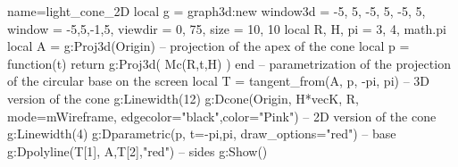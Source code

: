 \documentclass{standalone}
\begin{document}
\begin{luadraw}{name=light_cone_2D}
    local g = graph3d:new{
        window3d = {-5, 5, -5, 5, -5, 5},
        window = {-5,5,-1,5},
        viewdir = {0, 75},
        size = {10, 10}
    }
    local R, H, pi = 3, 4, math.pi
    local A = g:Proj3d(Origin) -- projection of the apex of the cone
    local p = function(t) return g:Proj3d( Mc(R,t,H) ) end -- parametrization of the projection of the circular base on the screen
    local T = tangent_from(A, p, -pi, pi)
    -- 3D version of the cone
    g:Linewidth(12)
    g:Dcone(Origin, H*vecK, R, {mode=mWireframe, edgecolor="black",color="Pink"})
    -- 2D version of the cone
    g:Linewidth(4)
    g:Dparametric(p, {t={-pi,pi}, draw_options="red"}) -- base
    g:Dpolyline({T[1], A,T[2]},"red") -- sides
    g:Show()
\end{luadraw}
\end{document}
